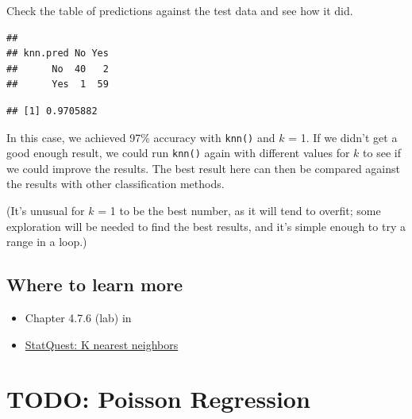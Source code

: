 \documentclass[
]{book}
\newenvironment{Shaded}{\begin{snugshade}}{\end{snugshade}}
\newcommand{\FunctionTok}[1]{\textcolor[rgb]{0.00,0.00,0.00}{#1}}
\newcommand{\NormalTok}[1]{#1}
\newcommand{\SpecialCharTok}[1]{\textcolor[rgb]{0.00,0.00,0.00}{#1}}
\providecommand{\tightlist}{%
  \setlength{\itemsep}{0pt}\setlength{\parskip}{0pt}}
\begin{document}
Check the table of predictions against the test data and see how it did.

\begin{Shaded}
\end{Shaded}

\begin{verbatim}
##         
## knn.pred No Yes
##      No  40   2
##      Yes  1  59
\end{verbatim}

\begin{Shaded}
\end{Shaded}

\begin{verbatim}
## [1] 0.9705882
\end{verbatim}

In this case, we achieved 97\% accuracy with \texttt{knn()} and \(k\) = 1. If we didn't get a good enough result, we could run \texttt{knn()} again with different values for \(k\) to see if we could improve the results. The best result here can then be compared against the results with other classification methods.

(It's unusual for \(k\) = 1 to be the best number, as it will tend to overfit; some exploration will be needed to find the best results, and it's simple enough to try a range in a loop.)

\hypertarget{where-to-learn-more-6}{%
\section{Where to learn more}\label{where-to-learn-more-6}}

\begin{itemize}
\tightlist
\item
  Chapter 4.7.6 (lab) in \citet{ISLR}
\item
  \href{https://www.youtube.com/watch?v=HVXime0nQeI}{StatQuest: K nearest neighbors}
\end{itemize}

\hypertarget{poisson-regression}{%
\chapter{TODO: Poisson Regression}\label{poisson-regression}}
\end{document}
